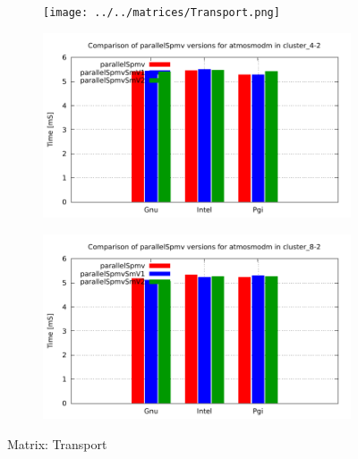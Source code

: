 \begin{figure} [ht!]
    \centering
    \captionsetup{justification=centering, singlelinecheck=false}
    \begin{subfigure}{.25\textwidth}
      \centering
      \hspace*{-1.5cm} 
      \texttt{[image: ../../matrices/Transport.png]}
      \label{fig:Transport_matrix}
    \end{subfigure}%
    \begin{subfigure}{.37\textwidth}
      \centering
      \hspace*{-1.0cm} 
      \includegraphics[page=9, width=0.95\linewidth]{../plots/myCluster_4-2.pdf}
      \label{fig:Transport_performance}
    \end{subfigure}
    \begin{subfigure}{.37\textwidth}
      \centering
      \hspace*{-1.0cm} 
      \includegraphics[page=9, width=0.95\linewidth]{../plots/myCluster_8-2.pdf}
      \label{fig:Transport_performance}
    \end{subfigure}
\caption{Matrix: Transport}
\label{fig:Transport}
\end{figure}


\medskip
